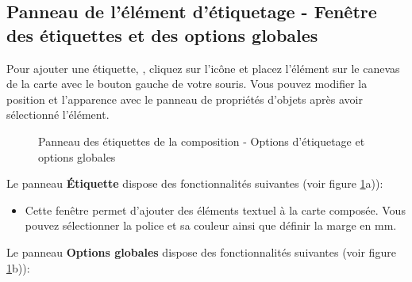 \subsection{Panneau de l'élément d'étiquetage - Fenêtre des étiquettes et des options globales}

Pour ajouter une étiquette, , cliquez sur l'icône  et placez l'élément sur le canevas de la carte avec le bouton gauche de votre souris. Vous pouvez modifier la position et l'apparence avec le panneau de propriétés d'objets après avoir sélectionné l'élément.

\begin{figure}[ht]
\centering
   \hspace{1cm}
   \caption{Panneau des étiquettes de la composition - Options d'étiquetage et options globales \nixcaption}\label{fig:label_option}
\end{figure}


Le panneau \textbf{Étiquette} dispose des fonctionnalités suivantes (voir figure \ref{fig:label_option}a)):

\begin{itemize}[label=--]
\item Cette fenêtre permet d'ajouter des éléments textuel à la carte composée. Vous pouvez sélectionner la police et sa couleur ainsi que définir la marge en mm.
\end{itemize}


Le panneau \textbf{Options globales} dispose des fonctionnalités suivantes (voir figure \ref{fig:label_option}b)):

